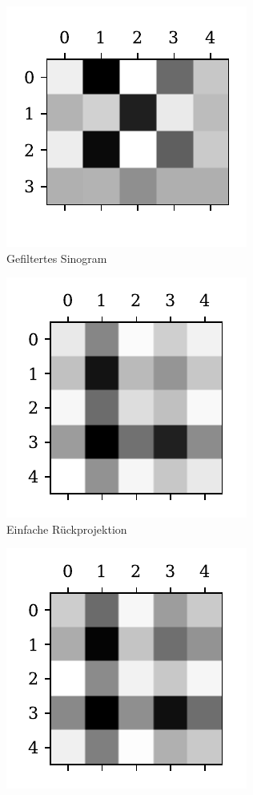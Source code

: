\documentclass[slug=PET, room=Andreas-Schubert-Bau\,\ 424A, supervisor=Carsten\ Bittrich, coursedate=10.\ 01.\ 2020]{../../Lab_Report_LaTeX/lab_report}
\begin{document}
\begin{figure}[htp]
\begin{subfigure}[t]{.25\textwidth}
    \centering
    \includegraphics[width=.6\textwidth]{../auswertung/figs/theory/convoluted.pdf}
    \caption{Gefiltertes Sinogram}
    \label{fig:theory-convoluted}
  \end{subfigure}
  \begin{subfigure}[t]{.25\textwidth}
    \centering
    \includegraphics[width=.6\textwidth]{../auswertung/figs/theory/rec_simple.pdf}
    \caption{Einfache R\"uckprojektion}
    \label{fig:theory-rec_simple}
  \end{subfigure}
  \begin{subfigure}[t]{.25\textwidth}
    \centering
    \includegraphics[width=.6\textwidth]{../auswertung/figs/theory/rec_filtered.pdf}

\end{subfigure}
\end{figure}
\end{document}
